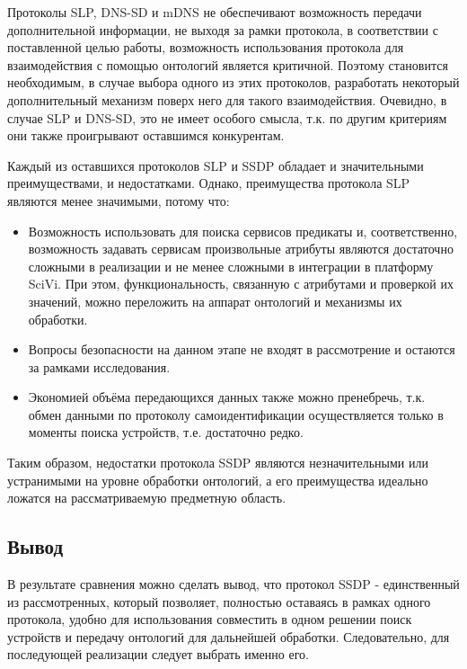 Протоколы SLP, DNS-SD и mDNS не обеспечивают возможность передачи дополнительной информации, не выходя за рамки протокола, в соответствии с поставленной целью работы, возможность использования протокола для взаимодействия с помощью онтологий является критичной.
Поэтому становится необходимым, в случае выбора одного из этих протоколов, разработать некоторый дополнительный механизм поверх него для такого взаимодействия.
Очевидно, в случае SLP и DNS-SD, это не имеет особого смысла, т.к.
по другим критериям они также проигрывают оставшимся конкурентам.

Каждый из оставшихся протоколов SLP и SSDP обладает и значительными преимуществами, и недостатками.
Однако, преимущества протокола SLP являются менее значимыми, потому что:
\begin{itemize}
	\item Возможность использовать для поиска сервисов предикаты и, соответственно, возможность задавать сервисам произвольные атрибуты являются достаточно сложными в реализации и не менее сложными в интеграции в платформу SciVi.
	При этом, функциональность, связанную с атрибутами и проверкой их значений, можно переложить на аппарат онтологий и механизмы их обработки.
	\item Вопросы безопасности на данном этапе не входят в рассмотрение и остаются за рамками исследования.
	\item Экономией объёма передающихся данных также можно пренебречь, т.к. обмен данными по протоколу самоидентификации осуществляется только в моменты поиска устройств, т.е. достаточно редко.
\end{itemize}

Таким образом, недостатки протокола SSDP являются незначительными или устранимыми на уровне обработки онтологий, а его преимущества идеально ложатся на рассматриваемую предметную область.

\subsection {Вывод}

В результате сравнения можно сделать вывод, что протокол SSDP - единственный из рассмотренных, который позволяет, полностью оставаясь в рамках одного протокола, удобно для использования совместить в одном решении поиск устройств и передачу онтологий для дальнейшей обработки. 
Следовательно, для последующей реализации следует выбрать именно его.
